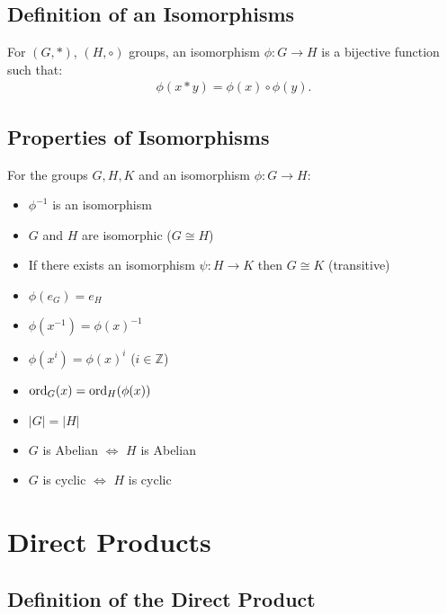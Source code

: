 \documentclass[a4paper, 12pt, twoside]{article}
\begin{document}
\subsection{Definition of an Isomorphisms}

For $(G, *)$, $(H, \circ)$ groups, an isomorphism $\phi : G \to H$
is a bijective function such that:
\begin{align*}
      \phi(x * y) = \phi(x) \circ \phi(y). \tag{$\forall x, y \in G$}
\end{align*}

\newpage

\subsection{Properties of Isomorphisms}

For the groups $G, H, K$ and an isomorphism $\phi : G \to H$:

\begin{multicols}{2}
      \begin{itemize}
            \item $\phi^{-1}$ is an isomorphism
            \item $G$ and $H$ are isomorphic ($G \cong H$)
            \item If there exists an isomorphism $\psi:H \to K$
                  then $G \cong K$ (transitive)
            \item $\phi(e_G) = e_H$
            \item $\phi(x^{-1}) = \phi(x)^{-1}$
      \end{itemize}
      \columnbreak
      \begin{itemize}
            \item $\phi(x^i) = \phi(x)^i$ ($i \in \mathbb{Z}$)
            \item $\operatorname{ord}_G(x) = \operatorname{ord}_H(\phi(x))$
            \item $|G| = |H|$
            \item $G$ is Abelian $\Leftrightarrow$ $H$ is Abelian
            \item $G$ is cyclic $\Leftrightarrow$ $H$ is cyclic
      \end{itemize}
\end{multicols}

\section{Direct Products}

\subsection{Definition of the Direct Product}
\end{document}
